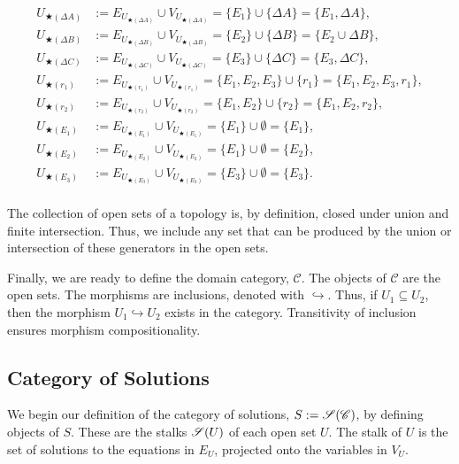 \documentclass{article}
\begin{document}
\begin{align}
	U_{\bigstar(\Delta A)} &:=
	E_{U_{\bigstar(\Delta A)}} \cup V_{U_{\bigstar(\Delta A)}} =
	\{E_1\} \cup \{\Delta A \} = \{E_1, \Delta A \},\\
	U_{\bigstar(\Delta B)} &:=
	E_{U_{\bigstar(\Delta B)}} \cup V_{U_{\bigstar(\Delta B)}} = 
	\{E_2\} \cup \{ \Delta B \} = \{E_2 \cup \Delta B \},\\
	U_{\bigstar(\Delta C)} &:=
	E_{U_{\bigstar(\Delta C)}} \cup V_{U_{\bigstar(\Delta C)}} =
	\{E_3\} \cup \{ \Delta C \}  = \{E_3, \Delta C \},\\
	U_{\bigstar(r_1)} &:=
	E_{U_{\bigstar(r_1)}} \cup V_{U_{\bigstar(r_1)}} =
	\{E_1,E_2,E_3\} \cup \{ r_1 \} = \{E_1,E_2,E_3, r_1 \},\\
	U_{\bigstar(r_2)} &:=
	E_{U_{\bigstar(r_2)}} \cup V_{U_{\bigstar(r_2)}} =
	\{E_1,E_2\} \cup \{ r_2 \} = \{E_1,E_2, r_2 \}, \\
	U_{\bigstar(E_1)} &:=
	E_{U_{\bigstar(E_1)}} \cup V_{U_{\bigstar(E_1)}} =
	\{E_1\} \cup \emptyset = \{E_1\}, \\
	U_{\bigstar(E_2)} &:=
	E_{U_{\bigstar(E_2)}} \cup V_{U_{\bigstar(E_2)}} =
	\{E_1\} \cup \emptyset = \{E_2\}, \\
	U_{\bigstar(E_3)} &:=
	E_{U_{\bigstar(E_3)}} \cup V_{U_{\bigstar(E_3)}} =
	\{E_3\} \cup \emptyset = \{E_3\}. \\
\end{align}

The collection of open sets of a topology is, by definition, closed under union
and finite intersection. Thus, we include any set that can be produced by the
union or intersection of these generators in the open sets.

Finally, we are ready to define the domain category, $\mathscr{C}$. The objects
of $\mathscr{C}$ are the open sets. The morphisms are inclusions, denoted with
$\hookrightarrow$. Thus, if $U_1 \subseteq U_2$, then the morphism $U_1
\hookrightarrow U_2 $ exists in the category. Transitivity of inclusion ensures
morphism compositionality.

\subsection{Category of Solutions}

We begin our definition of the category of solutions, $S := \mathscr{S}(\mathscr{C})$,
by defining objects of $S$. These are the stalks $\mathscr{S}(U)$ of each open set $U$.
The stalk of  $U$ is the set of solutions to the equations in $E_U$, projected
onto the variables in  $V_U$.
\end{document}

